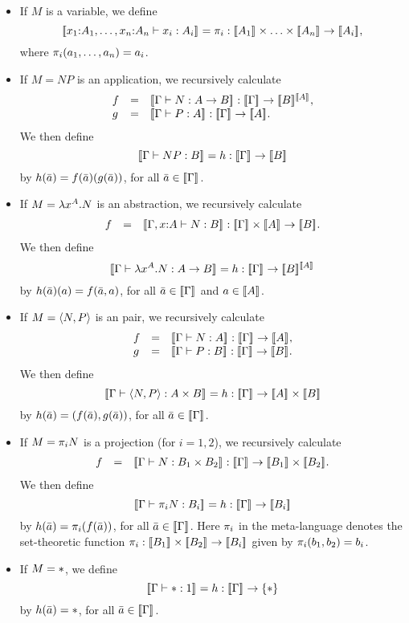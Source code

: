 \documentclass{article}
\begin{document}
\begin{itemize}
\item If $M$ is a variable, we define 
  \[ \semm{\typ{x_1}{A_1},\ldots,\typ{x_n}{A_n}\tj x_i:A_i} = \proj{i}
  : \semm{A_1}\times\ldots\times\semm{A_n}\to\semm{A_i},
  \]
  where $\pi_{i}(a_1,\ldots,a_n) = a_i$.
\item If $M=NP$ is an application, we recursively calculate
  \[ \begin{array}{lll}
    f &=& \semm{\Gamma\tj N:A\to B}
    : \semm{\Gamma}\to\semm{B}^{\semm{A}}, \\
    g &=& \semm{\Gamma\tj P:A} : \semm{\Gamma}\to\semm{A}.
  \end{array}
  \]
  We then define
  \[ [\![\Gamma\vdash NP:B]\!]_{} = h : [\![\Gamma]\!]_{}\to[\![B]\!]_{}
  \]
  by $h(\bar a)=f(\bar a)(g(\bar a))$, for all $\bar a\in[\![\Gamma]\!]_{}$.
\item If $M=\lambda x^{A}.N$ is an abstraction, we recursively calculate
  \[ \begin{array}{lll}
    f &=& \semm{\Gamma,\typ{x}{A}\tj N:B}
    : \semm{\Gamma}\times\semm{A}\to\semm{B}.
  \end{array}
  \]
  We then define
  \[ \semm{\Gamma\tj\lamabs{x}{A}.N:A\to B} = h 
  : \semm{\Gamma}\to\semm{B}^{\semm{A}}
  \]
  by $h(\bar a)(a) = f(\bar a,a)$, for all $\bar a\in[\![\Gamma]\!]_{}$ and
  $a\in[\![A]\!]_{}$.
\item If $M=\langle N,P\rangle$ is an pair, we recursively calculate
  \[ \begin{array}{lll}
    f &=& \semm{\Gamma\tj N:A} : \semm{\Gamma}\to\semm{A}, \\
    g &=& \semm{\Gamma\tj P:B} : \semm{\Gamma}\to\semm{B}.
  \end{array}
  \]
  We then define
  \[ \semm{\Gamma\tj \pair{N,P}:A\times B} = h 
  : \semm{\Gamma}\to\semm{A}\times\semm{B}
  \]
  by $h(\bar a)=(f(\bar a),g(\bar a))$, for all $\bar a\in[\![\Gamma]\!]_{}$.
\item If $M=\pi_{i}N$ is a projection (for $i=1,2$), we recursively
  calculate
  \[ \begin{array}{lll}
    f &=& \semm{\Gamma\tj N:B_1\times B_2} 
    : \semm{\Gamma}\to\semm{B_1}\times\semm{B_2}.
  \end{array}
  \]
  We then define
  \[ [\![\Gamma\vdash \pi_{i}N:B_i]\!]_{} = h 
  : [\![\Gamma]\!]_{}\to[\![B_i]\!]_{}
  \]
  by $h(\bar a)=\pi_{i}(f(\bar a))$, for all $\bar a\in[\![\Gamma]\!]_{}$.
  Here $\pi_{i}$ in the meta-language denotes the set-theoretic
  function $\pi_{i}:[\![B_1]\!]_{}\times[\![B_2]\!]_{}\to[\![B_i]\!]_{}$ given by
  $\pi_{i}(b_1,b_2) = b_i$.
\item If $M={*}$, we define
  \[ [\![\Gamma\vdash{*}:1]\!]_{} = h : [\![\Gamma]\!]_{}\to\{*\}
  \]
  by $h(\bar a)=*$, for all $\bar a\in[\![\Gamma]\!]_{}$.
\end{itemize}
\end{document}

